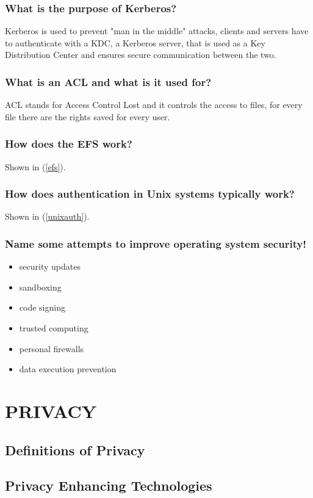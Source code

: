 \documentclass[a4paper, 10 pt, conference]{ieeeconf}
\begin{document}
\subsubsection{\textbf{What is the purpose of Kerberos?}}
Kerberos is used to prevent "man in the middle" attacks, clients and servers have to authenticate with a KDC, a Kerberos server, that is used as a Key Distribution Center and ensures secure communication between the two. 
\subsubsection{\textbf{What is an ACL and what is it used for?}}
ACL stands for Access Control Lost and it controls the access to files, for every file there are the rights saved for every user. 
\subsubsection{\textbf{How does the EFS work?}}
Shown in (\ref{efs}).
\subsubsection{\textbf{How does authentication in Unix systems typically work?}}
Shown in (\ref{unixauth}).
\subsubsection{\textbf{Name some attempts to improve operating system security!}}
\begin{itemize}
\item security updates
\item sandboxing
\item code signing
\item trusted computing
\item personal firewalls
\item data execution prevention
\end{itemize}

\pagebreak


\section{\textbf{PRIVACY}}

\subsection{\textbf{Definitions of Privacy}}

\subsection{\textbf{Privacy Enhancing Technologies}}
\vspace{0.5cm}
\end{document}
